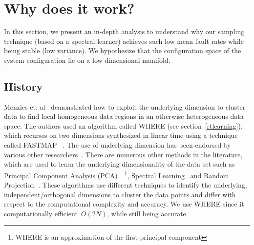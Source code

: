 \documentclass[smallextended]{svjour3}       %
\begin{document}
\section{Why does it work?}
In this section, we present an in-depth analysis to understand why our sampling technique (based on a spectral learner) achieves such low mean fault rates while being stable (low variance). We hypothesize that the configuration space of the system configuration lie on a low dimensional manifold. 

\subsection{History}
Menzies et. al~\cite{me12d}  demonstrated how to exploit the underlying dimension to cluster data to find local homogeneous data regions in an otherwise heterogeneous data space. The authors used an algorithm called WHERE (see section~\ref{rtlearning}), which recurses on two dimensions synthesized in linear time using a technique called FASTMAP ~\cite{faloutsos1995fastmap}. The use of underlying dimension has been endorsed by various other researchers~\cite{bettenburg2012think, deiters2013using, bettenburg2015towards, zhang2016cross}. There are numerous other methods in the literature, which are used to learn the underlying dimensionality of the data set such as Principal Component Analysis (PCA)~\cite{jolliffe2002principal}~\footnote{WHERE is an approximation of the first principal component}, Spectral Learning~\cite{shi2000normalized} and Random Projection~\cite{bingham2001random}.  These algorithms  use  different techniques to identify the underlying, independent/orthogonal dimensions to cluster the data points and differ with respect to the computational complexity and accuracy. We use WHERE since it computationally efficient~$O(2N)$, while still being accurate.
\end{document}
